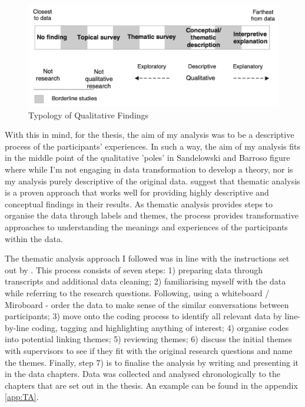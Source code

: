 \begin{figure}[htp]
    \centering
    \includegraphics[width=1\linewidth]{Images/Methodology/TypologyOfQualitativeFindings.png}
    \caption{Typology of Qualitative Findings \citep{sandelowski2003classifying}}
    \label{fig:typology}
\end{figure}

With this in mind, for the thesis, the aim of my analysis was to be a descriptive process of the participants' experiences. In such a way, the aim of my analysis fits in the middle point of the qualitative 'poles' in Sandelowski and Barroso figure where while I'm not engaging in data transformation to develop a theory, nor is my analysis purely descriptive of the original data. \citep{kiger2020thematic} suggest that thematic analysis is a proven approach that works well for providing highly descriptive and conceptual findings in their results. As thematic analysis provides steps to organise the data through labels and themes, the process provides transformative approaches to understanding the meanings and experiences of the participants within the data. 

The thematic analysis approach I followed was in line with the instructions set out by \cite{braun_one_2020}. This process consists of seven steps: 1) preparing data through transcripts and additional data cleaning; 2) familiarising myself with the data while referring to the research questions. Following, using a whiteboard / Miroboard - order the data to make sense of the similar conversations between participants; 3) move onto the coding process to identify all relevant data by line-by-line coding, tagging and highlighting anything of interest; 4) organise codes into potential linking themes; 5) reviewing themes; 6) discuss the initial themes with supervisors to see if they fit with the original research questions and name the themes. Finally, step 7) is to finalise the analysis by writing and presenting it in the data chapters. Data was collected and analysed chronologically to the chapters that are set out in the thesis. An example can be found in the appendix \ref{app:TA}.

